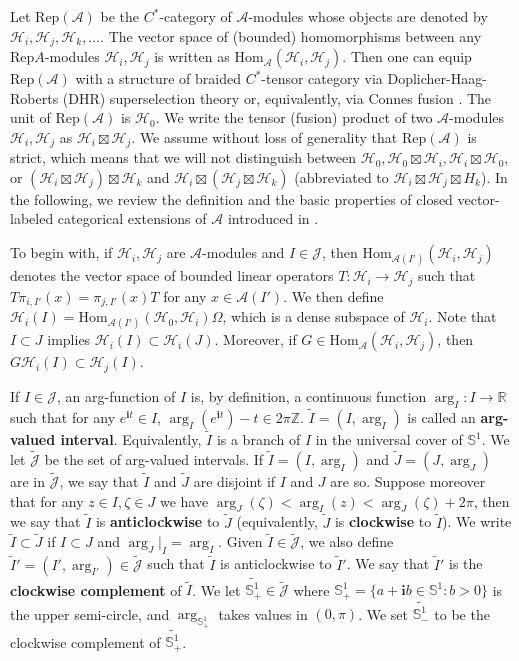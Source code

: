 \documentclass[11pt,b5paper,notitlepage]{article}
\theoremstyle{definition}
\theoremstyle{plain}
\newcommand{\mc}{\mathcal}
\newcommand{\wtd}{\widetilde}
\newcommand{\Hom}{\mathrm{Hom}}
\newcommand{\Rep}{\mathrm{Rep}}
\newcommand{\Jtd}{\widetilde{\mathcal J}}
\newcommand{\im}{\mathbf{i}}
\newcommand{\RepA}{\mathrm{Rep}(\mc A)}
\newcommand{\mbb}{\mathbb}
\numberwithin{equation}{subsection}
\begin{document}
Let $\RepA$ be the $C^*$-category of $\mc A$-modules whose objects are denoted by $\mc H_i,\mc H_j,\mc H_k,\dots$. The vector space of (bounded) homomorphisms between any $\Rep A$-modules  $\mc H_i,\mc H_j$ is written as $\Hom_{\mc A}(\mc H_i,\mc H_j)$. Then one can equip $\RepA$ with a structure of braided $C^*$-tensor category via Doplicher-Haag-Roberts (DHR) superselection theory \cite{FRS89,FRS92} or, equivalently, via Connes fusion \cite{Gui21a}. The unit of $\RepA$ is $\mc H_0$. We write the tensor (fusion) product of two $\mc A$-modules $\mc H_i,\mc H_j$ as $\mc H_i\boxtimes\mc H_j$. We assume without loss of generality that $\RepA$ is strict, which means that we will not distinguish between $\mc H_0,\mc H_0\boxtimes\mc H_i,\mc H_i\boxtimes\mc H_0$, or $(\mc H_i\boxtimes \mc H_j)\boxtimes\mc H_k$ and $\mc H_i\boxtimes(\mc H_j\boxtimes\mc H_k)$ (abbreviated to $\mc H_i\boxtimes\mc H_j\boxtimes H_k$). In the following, we review the definition and the basic properties of closed vector-labeled categorical extensions of $\mc A$  introduced in \cite{Gui21a}.

To begin with, if $\mc H_i,\mc H_j$ are $\mc A$-modules and $I\in\mc J$, then $\Hom_{\mc A(I')}(\mc H_i,\mc H_j)$ denotes the vector space of bounded linear operators $T:\mc H_i\rightarrow\mc H_j$ such that $T\pi_{i,I'}(x)=\pi_{j,I'}(x)T$ for any $x\in\mc A(I')$. We then define $\mc H_i(I)=\Hom_{\mc A(I')}(\mc H_0,\mc H_i)\Omega$, which is a dense subspace of $\mc H_i$. Note that $I\subset J$ implies $\mc H_i(I)\subset\mc H_i(J)$. Moreover, if $G\in\Hom_{\mc A}(\mc H_i,\mc H_j)$, then $G\mc H_i(I)\subset\mc H_j(I)$.

If $I\in\mc J$, an arg-function of $I$ is, by definition, a continuous function $\arg_I:I\rightarrow\mbb R$ such that for any $e^{\im t}\in I$, $\arg_I(e^{\im t})-t\in 2\pi\mbb Z$. $\wtd I=(I,\arg_I)$ is called an \textbf{arg-valued interval}. Equivalently, $\wtd I$ is a branch of $I$ in the universal cover of $\mbb S^1$. We let $\wtd{\mc J}$ be the set of arg-valued intervals. If $\wtd I=(I,\arg_I)$ and $\wtd J=(J,\arg_J)$ are in $\Jtd$, we say that $\wtd I$ and $\wtd J$ are disjoint if $I$ and $J$ are so. Suppose moreover that for any $z\in I,\zeta\in J$ we have $\arg_J(\zeta)<\arg_I(z)<\arg_J(\zeta)+2\pi$, then we say that $\wtd I$ is \textbf{anticlockwise} to $\wtd J$ (equivalently, $\wtd J$ is \textbf{clockwise} to $\wtd I$). We write $\wtd I\subset\wtd J$ if $I\subset J$ and $\arg_J|_I=\arg_I$. Given $\wtd I\in\Jtd$, we also define $\wtd I'=(I',\arg_{I'})\in\Jtd$ such that $\wtd I$ is anticlockwise to $\wtd I'$. We say that $\wtd I'$ is the \textbf{clockwise complement} of $\wtd I$. We let $\wtd{\mbb S^1_+}\in\Jtd$ where $\mbb S^1_+=\{a+\im b\in\mbb S^1:b>0 \}$ is the upper semi-circle, and $\arg_{\mbb S^1_+}$ takes values in $(0,\pi)$. We set $\wtd{\mbb S^1_-}$ to be the clockwise complement of $\wtd{\mbb S^1_+}$.
\end{document}
